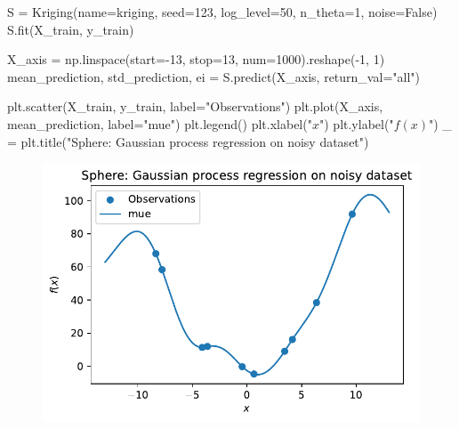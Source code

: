 \documentclass[
  letterpaper,
  DIV=11,
  numbers=noendperiod]{scrreprt}
\newenvironment{Shaded}{\begin{snugshade}}{\end{snugshade}}
\newcommand{\DecValTok}[1]{\textcolor[rgb]{0.68,0.00,0.00}{#1}}
\newcommand{\NormalTok}[1]{\textcolor[rgb]{0.00,0.23,0.31}{#1}}
\newcommand{\OperatorTok}[1]{\textcolor[rgb]{0.37,0.37,0.37}{#1}}
\newcommand{\StringTok}[1]{\textcolor[rgb]{0.13,0.47,0.30}{#1}}
\newcommand{\VariableTok}[1]{\textcolor[rgb]{0.07,0.07,0.07}{#1}}
\begin{document}
\begin{Shaded}
\begin{Highlighting}[]
\NormalTok{S }\OperatorTok{=}\NormalTok{ Kriging(name}\OperatorTok{=}\StringTok{\textquotesingle{}kriging\textquotesingle{}}\NormalTok{,}
\NormalTok{            seed}\OperatorTok{=}\DecValTok{123}\NormalTok{,}
\NormalTok{            log\_level}\OperatorTok{=}\DecValTok{50}\NormalTok{,}
\NormalTok{            n\_theta}\OperatorTok{=}\DecValTok{1}\NormalTok{,}
\NormalTok{            noise}\OperatorTok{=}\VariableTok{False}\NormalTok{)}
\NormalTok{S.fit(X\_train, y\_train)}

\NormalTok{X\_axis }\OperatorTok{=}\NormalTok{ np.linspace(start}\OperatorTok{={-}}\DecValTok{13}\NormalTok{, stop}\OperatorTok{=}\DecValTok{13}\NormalTok{, num}\OperatorTok{=}\DecValTok{1000}\NormalTok{).reshape(}\OperatorTok{{-}}\DecValTok{1}\NormalTok{, }\DecValTok{1}\NormalTok{)}
\NormalTok{mean\_prediction, std\_prediction, ei }\OperatorTok{=}\NormalTok{ S.predict(X\_axis, return\_val}\OperatorTok{=}\StringTok{"all"}\NormalTok{)}

\NormalTok{plt.scatter(X\_train, y\_train, label}\OperatorTok{=}\StringTok{"Observations"}\NormalTok{)}
\NormalTok{plt.plot(X\_axis, mean\_prediction, label}\OperatorTok{=}\StringTok{"mue"}\NormalTok{)}
\NormalTok{plt.legend()}
\NormalTok{plt.xlabel(}\StringTok{"$x$"}\NormalTok{)}
\NormalTok{plt.ylabel(}\StringTok{"$f(x)$"}\NormalTok{)}
\NormalTok{\_ }\OperatorTok{=}\NormalTok{ plt.title(}\StringTok{"Sphere: Gaussian process regression on noisy dataset"}\NormalTok{)}
\end{Highlighting}
\end{Shaded}

\begin{figure}[H]

{\centering \includegraphics{014_num_spot_ocba_files/figure-pdf/cell-10-output-1.pdf}

}

\end{figure}
\end{document}
